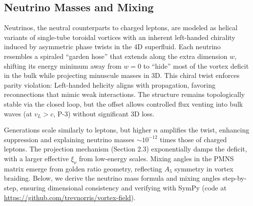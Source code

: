 
\subsection{Neutrino Masses and Mixing}

Neutrinos, the neutral counterparts to charged leptons, are modeled as helical variants of single-tube toroidal vortices with an inherent left-handed chirality induced by asymmetric phase twists in the 4D superfluid. Each neutrino resembles a spiraled ``garden hose'' that extends along the extra dimension $w$, shifting its energy minimum away from $w=0$ to ``hide'' most of the vortex deficit in the bulk while projecting minuscule masses in 3D. This chiral twist enforces parity violation: Left-handed helicity aligns with propagation, favoring reconnections that mimic weak interactions. The structure remains topologically stable via the closed loop, but the offset allows controlled flux venting into bulk waves (at $v_L > c$, P-3) without significant 3D loss.

Generations scale similarly to leptons, but higher $n$ amplifies the twist, enhancing suppression and explaining neutrino masses $\sim 10^{-12}$ times those of charged leptons. The projection mechanism (Section 2.3) exponentially damps the deficit, with a larger effective $\xi_\nu$ from low-energy scales. Mixing angles in the PMNS matrix emerge from golden ratio geometry, reflecting $A_5$ symmetry in vortex braiding. Below, we derive the neutrino mass formula and mixing angles step-by-step, ensuring dimensional consistency and verifying with SymPy (code at \url{https://github.com/trevnorris/vortex-field}).

